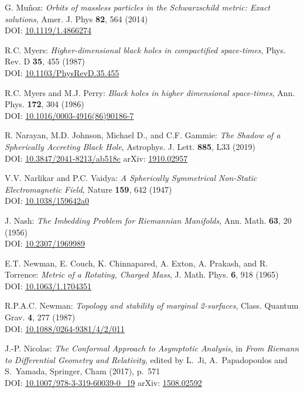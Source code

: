 \begin{thebibliography}{123}
G. Mu\~noz:
{\em Orbits of massless particles in the Schwarzschild metric: Exact solutions},
Amer. J. Phys {\bf 82}, 564 (2014)\\
DOI: \href{https://doi.org/10.1119/1.4866274}{10.1119/1.4866274}

R.C. Myers:
{\em Higher-dimensional black holes in compactified space-times},
Phys. Rev. D {\bf 35}, 455 (1987)\\
DOI: \href{https://doi.org/10.1103/PhysRevD.35.455}{10.1103/PhysRevD.35.455}

R.C. Myers and M.J. Perry:
{\em Black holes in higher dimensional space-times},
Ann. Phys. {\bf 172}, 304 (1986)\\
DOI: \href{https://doi.org/10.1016/0003-4916(86)90186-7}{10.1016/0003-4916(86)90186-7}

R. Narayan, M.D. Johnson, Michael D., and C.F. Gammie:
{\em The Shadow of a Spherically Accreting Black Hole},
Astrophys. J. Lett. {\bf 885}, L33 (2019)\\
DOI: \href{https://doi.org/10.3847/2041-8213/ab518c}{10.3847/2041-8213/ab518c}\hfill
arXiv: \href{https://arxiv.org/abs/1910.02957}{1910.02957}

V.V. Narlikar and P.C. Vaidya:
{\em A Spherically Symmetrical Non-Static Electromagnetic Field},
Nature {\bf 159}, 642 (1947) \\
DOI: \href{https://doi.org/10.1038/159642a0}{10.1038/159642a0}

J. Nash:
{\em The Imbedding Problem for Riemannian Manifolds},
Ann. Math. {\bf 63}, 20 (1956)\\
DOI: \href{https://doi.org/10.2307/1969989}{10.2307/1969989}

E.T. Newman, E. Couch, K. Chinnapared, A. Exton, A. Prakash, and R. Torrence:
{\em Metric of a Rotating, Charged Mass},
J. Math. Phys. {\bf 6}, 918 (1965)\\
DOI: \href{https://doi.org/10.1063/1.1704351}{10.1063/1.1704351}

R.P.A.C. Newman:
{\em Topology and stability of marginal 2-surfaces},
Class. Quantum Grav. {\bf 4}, 277 (1987)\\
DOI: \href{https://doi.org/10.1088/0264-9381/4/2/011}{10.1088/0264-9381/4/2/011}

J.-P. Nicolas:
{\em The Conformal Approach to Asymptotic Analysis},
in {\em From Riemann to Differential Geometry and Relativity},
edited by L.~Ji, A.~Papadopoulos and S.~Yamada, Springer, Cham (2017), p.~571\\
DOI: \href{https://doi.org/10.1007/978-3-319-60039-0_19}{10.1007/978-3-319-60039-0\_19}\hfill
arXiv: \href{https://arxiv.org/abs/1508.02592}{1508.02592}


\end{thebibliography}
